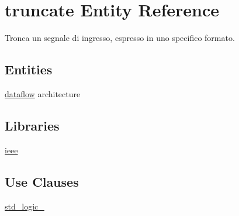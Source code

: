 \hypertarget{classtruncate}{\section{truncate Entity Reference}
\label{classtruncate}
}


Tronca un segnale di ingresso, espresso in uno specifico formato.  


\subsection*{Entities}
\begin{DoxyCompactItemize}
\item 
\hyperlink{classtruncate_1_1dataflow}{dataflow} architecture
\end{DoxyCompactItemize}
\subsection*{Libraries}
 \begin{DoxyCompactItemize}
\item 
\hypertarget{classtruncate_a0a6af6eef40212dbaf130d57ce711256}{\hyperlink{classtruncate_a0a6af6eef40212dbaf130d57ce711256}{ieee} }\label{classtruncate_a0a6af6eef40212dbaf130d57ce711256}

\end{DoxyCompactItemize}
\subsection*{Use Clauses}
 \begin{DoxyCompactItemize}
\item 
\hypertarget{classtruncate_acd03516902501cd1c7296a98e22c6fcb}{\hyperlink{classtruncate_acd03516902501cd1c7296a98e22c6fcb}{std\+\_\+logic\+\_}   }\label{classtruncate_acd03516902501cd1c7296a98e22c6fcb}

\end{DoxyCompactItemize}
